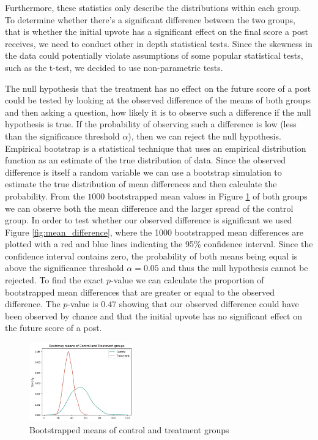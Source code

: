 \documentclass[fleqn,12pt]{article}
\begin{document}
Furthermore, these statistics only describe the distributions 
within each group. To determine whether there's a significant 
difference between the two groups, that is whether the 
initial upvote has a significant effect on the final score a post 
receives, we need to conduct other in depth statistical tests.
Since the skewness in the data could potentially violate assumptions
of some popular statistical tests, such as the t-test, we decided to use
non-parametric tests.

The null hypothesis
that the treatment has no effect on the future score of a post
could be tested by looking at the observed difference of the means of both groups
and then asking a question, how likely it is to observe such a difference
if the null hypothesis is true. If the probability of observing such a difference
is low (less than the significance threshold $\alpha$), then we can reject the null hypothesis.
Empirical bootstrap is a statistical technique that uses an empirical distribution 
function as an estimate of the true distribution of data. Since
the observed difference is itself a random variable we can use a bootstrap simulation
to estimate the true distribution of mean differences and then calculate the probability.
From the $1000$ bootstrapped mean values in Figure \ref{fig:bootstrap_both_means} of both groups we can observe both the mean difference
and the larger spread of the control group. In order to test
whether our observed difference is significant we used Figure \ref{fig:mean_difference},
where the 1000 bootstrapped mean differences are plotted with a red and blue lines
indicating the 95\% confidence interval. Since the confidence interval contains zero, the
probability of both means being equal is above the significance threshold $\alpha = 0.05$ and 
thus the null hypothesis cannot be rejected. 
To find the exact $p$-value we can calculate
the proportion of bootstrapped mean differences that are greater or equal to the observed difference.
The $p$-value is $0.47$ showing that our observed difference could have been observed by chance
and that the initial upvote has no significant effect on the future score of a post.

\begin{figure}[h]
  \centering
  \includegraphics[width=0.4\textwidth]{figures/both_means.png}
  \caption{Bootstrapped means of control and treatment groups}
  \label{fig:bootstrap_both_means}
\end{figure}
\end{document}
